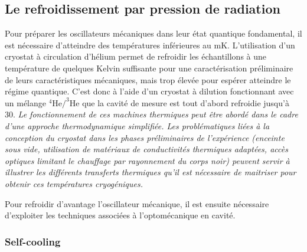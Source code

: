 \documentclass[12pt,a4paper]{article}
\begin{document}
\subsection{Le refroidissement par pression de radiation}

Pour préparer les oscillateurs mécaniques dans leur état quantique fondamental, il est nécessaire d'atteindre des températures inférieures au mK.
L'utilisation d'un cryostat à circulation d'hélium permet de refroidir les échantillons à une température de quelques Kelvin suffisante pour une caractérisation préliminaire de leurs caractéristiques mécaniques, mais trop élevée pour espérer atteindre le régime quantique.
C'est donc à l'aide d'un cryostat à dilution fonctionnant avec un mélange $\mathrm{^4He/^3He}$ que la cavité de mesure est tout d'abord refroidie jusqu'à \unit{30}{\milli\kelvin}.
\textit{Le fonctionnement de ces machines thermiques peut être abordé dans le cadre d'une approche thermodynamique simplifiée.
Les problématiques liées à la conception du cryostat dans les phases préliminaires de l'expérience (enceinte sous vide, utilisation de matériaux de conductivités thermiques adaptées, accès optiques limitant le chauffage par rayonnement du corps noir) peuvent servir à illustrer les différents transferts thermiques qu'il est nécessaire de maitriser pour obtenir ces températures cryogéniques.}

Pour refroidir d'avantage l'oscillateur mécanique, il est ensuite nécessaire d'exploiter les techniques associées à l'optomécanique en cavité.

\subsubsection{Self-cooling}
\end{document}
